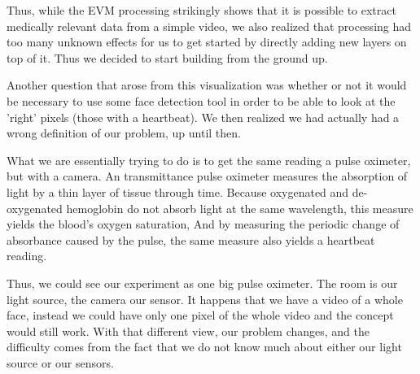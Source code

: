 \documentclass[12pt]{article}
\begin{document}
  Thus, while the EVM processing strikingly shows that it is possible to extract medically relevant data from a simple video, we also realized that processing had too many 
  unknown effects for us to get started by directly adding new layers on top of it. Thus we decided to start building from the ground up.

  Another question that arose from this visualization was whether or not it would be necessary to use some face detection tool in order to be able to look at the 'right' pixels (those with a heartbeat). We then realized we had actually had a wrong definition of our problem, up until then.

  What we are essentially trying to do is to get the same reading a pulse oximeter, but with a camera.
  An transmittance pulse oximeter measures the absorption of light by a thin layer of tissue through time. Because oxygenated and de-oxygenated hemoglobin do not absorb light at the same wavelength, this measure yields the blood's oxygen saturation, And by measuring the periodic change of absorbance caused by the pulse, the same measure also yields a heartbeat reading.

  Thus, we could see our experiment as one big pulse oximeter. The room is our light source, the camera our sensor. It happens that we have a video of a whole face, instead we could have only one pixel of the whole video and the concept would still work. With that different view, our problem changes, and the difficulty comes from the fact that we do not know much about either our light source or our sensors.

\end{document}
